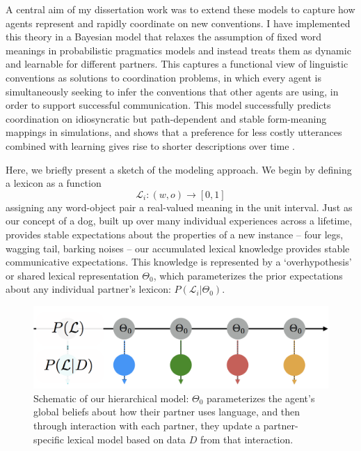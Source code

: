 \documentclass[11pt]{article}
\begin{document}
A central aim of my dissertation work was to extend these models to capture how agents represent and rapidly coordinate on new conventions.%
I have implemented this theory in a Bayesian model that relaxes the assumption of fixed word meanings in probabilistic pragmatics models and instead treats them as dynamic and learnable for different partners. 
This captures a functional view of linguistic conventions as solutions to coordination problems, in which every agent is simultaneously seeking to infer the conventions that other agents are using, in order to support successful communication. 
This model successfully predicts coordination on idiosyncratic but path-dependent and stable form-meaning mappings in simulations, and shows that a preference for less costly utterances combined with learning gives rise to shorter descriptions over time \cite{hawkins_convention-formation_2017}.


Here, we briefly present a sketch of the modeling approach. We begin by defining a lexicon as a function $$\mathcal{L}_i: (w, o) \rightarrow [0,1]$$ assigning any word-object pair a real-valued meaning in the unit interval. Just as our concept of a dog, built up over many individual experiences across a lifetime, provides stable expectations about the properties of a new instance -- four legs, wagging tail, barking noises -- our accumulated lexical knowledge provides stable communicative expectations. 
This knowledge is represented by a `overhypothesis' or shared lexical representation $\Theta_0$, which parameterizes the prior expectations about any individual partner's lexicon: $P(\mathcal{L}_i | \Theta_0)$. 

\begin{figure}[b]
\centering
\includegraphics[scale=.4]{model_schematic.png}
\caption{Schematic of our hierarchical model: $\Theta_0$ parameterizes the agent's global beliefs about how their partner uses language, and then through interaction with each partner, they update a partner-specific lexical model based on data $D$ from that interaction.}
\label{fig:modelschematic}
\end{figure}
\end{document}
